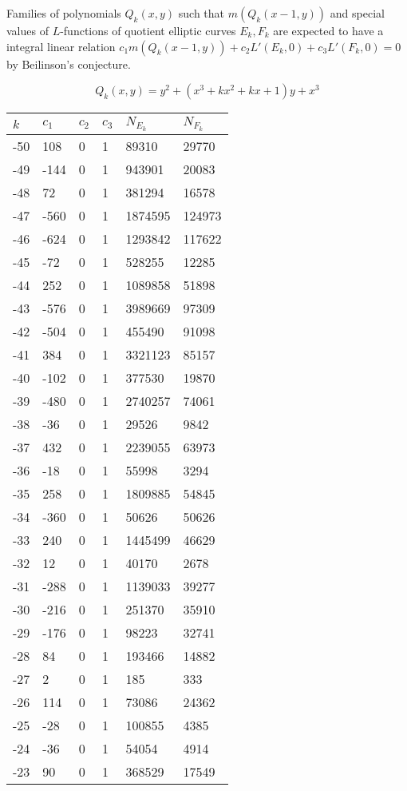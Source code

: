\documentclass{amsart}
\begin{document}
Families of polynomials $Q_k(x,y)$ such that $m(Q_k(x-1,y))$ and special values of $L$-functions of quotient elliptic curves $E_k,F_k$ are expected to have a integral linear relation $c_1m(Q_k(x-1,y))+c_2L'(E_k,0)+c_3L'(F_k,0)=0$ by Beilinson's conjecture.

$$Q_k(x,y)=y^2 + (x^3 + kx^2 + kx + 1)y + x^3$$
\begin{longtable}{llllll}
\hline
$k$ & $c_1$ & $c_2$ & $c_3$ & $N_{E_k}$ & $N_{F_k}$\\
\hline
-50 & 108 & 0 & 1 & 89310 & 29770\\
-49 & -144 & 0 & 1 & 943901 & 20083\\
-48 & 72 & 0 & 1 & 381294 & 16578\\
-47 & -560 & 0 & 1 & 1874595 & 124973\\
-46 & -624 & 0 & 1 & 1293842 & 117622\\
-45 & -72 & 0 & 1 & 528255 & 12285\\
-44 & 252 & 0 & 1 & 1089858 & 51898\\
-43 & -576 & 0 & 1 & 3989669 & 97309\\
-42 & -504 & 0 & 1 & 455490 & 91098\\
-41 & 384 & 0 & 1 & 3321123 & 85157\\
-40 & -102 & 0 & 1 & 377530 & 19870\\
-39 & -480 & 0 & 1 & 2740257 & 74061\\
-38 & -36 & 0 & 1 & 29526 & 9842\\
-37 & 432 & 0 & 1 & 2239055 & 63973\\
-36 & -18 & 0 & 1 & 55998 & 3294\\
-35 & 258 & 0 & 1 & 1809885 & 54845\\
-34 & -360 & 0 & 1 & 50626 & 50626\\
-33 & 240 & 0 & 1 & 1445499 & 46629\\
-32 & 12 & 0 & 1 & 40170 & 2678\\
-31 & -288 & 0 & 1 & 1139033 & 39277\\
-30 & -216 & 0 & 1 & 251370 & 35910\\
-29 & -176 & 0 & 1 & 98223 & 32741\\
-28 & 84 & 0 & 1 & 193466 & 14882\\
-27 & 2 & 0 & 1 & 185 & 333\\
-26 & 114 & 0 & 1 & 73086 & 24362\\
-25 & -28 & 0 & 1 & 100855 & 4385\\
-24 & -36 & 0 & 1 & 54054 & 4914\\
-23 & 90 & 0 & 1 & 368529 & 17549\\

\end{longtable}
\end{document}
